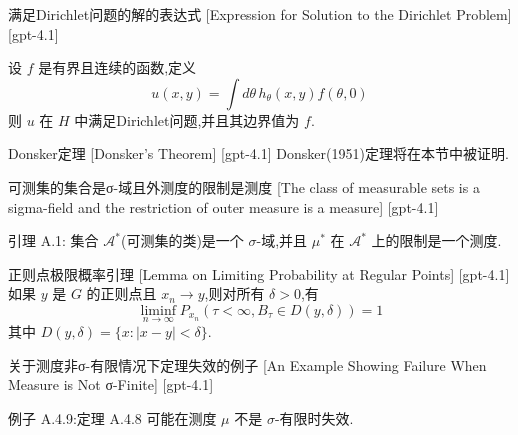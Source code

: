 \documentclass[UTF8]{ctexart}
\begin{document}
    
    
    \begin{thm}
        {满足Dirichlet问题的解的表达式}
        [Expression for Solution to the Dirichlet Problem]
        [gpt-4.1]
        
设 $f$ 是有界且连续的函数,定义
\[
u(x, y) = \int d\theta\, h_\theta(x, y) f(\theta, 0)
\]
则 $u$ 在 $H$ 中满足Dirichlet问题,并且其边界值为 $f$.

    \end{thm}
    
    
    
    \begin{thm}
        {Donsker定理}
        [Donsker's Theorem]
        [gpt-4.1]
        Donsker(1951)定理将在本节中被证明.
    \end{thm}
    
    
    
    \begin{lma}
        {可测集的集合是σ-域且外测度的限制是测度}
        [The class of measurable sets is a sigma-field and the restriction of outer measure is a measure]
        [gpt-4.1]
        
引理 A.1: 集合 $\mathcal{A}^*$(可测集的类)是一个 $\sigma$-域,并且 $\mu^*$ 在 $\mathcal{A}^*$ 上的限制是一个测度.

    \end{lma}
    
    
    
    \begin{lma}
        {正则点极限概率引理}
        [Lemma on Limiting Probability at Regular Points]
        [gpt-4.1]
        如果 $y$ 是 $G$ 的正则点且 $x_{n} \to y$,则对所有 $\delta > 0$,有
\[
\liminf_{n \to \infty} P_{x_{n}}(\tau < \infty, B_{\tau} \in D(y, \delta)) = 1
\]
其中 $D(y, \delta) = \{ x : |x - y| < \delta \}$.
    \end{lma}
    
    
    
    \begin{xmp}
        {关于测度非σ-有限情况下定理失效的例子}
        [An Example Showing Failure When Measure is Not σ-Finite]
        [gpt-4.1]
        
例子 A.4.9:定理 A.4.8 可能在测度 $\mu$ 不是 $\sigma$-有限时失效.

    \end{xmp}
    
\end{document}
